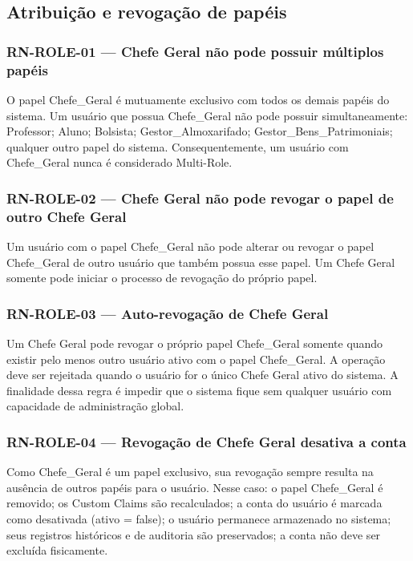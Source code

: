 \subsection{Atribuição e revogação de papéis}
\label{sec:regras-role}
\subsubsection{RN-ROLE-01 — Chefe Geral não pode possuir múltiplos papéis}
O papel Chefe\_Geral é mutuamente exclusivo com todos os demais papéis do sistema.
Um usuário que possua Chefe\_Geral não pode possuir simultaneamente:
Professor;
Aluno;
Bolsista;
Gestor\_Almoxarifado;
Gestor\_Bens\_Patrimoniais;
qualquer outro papel do sistema.
Consequentemente, um usuário com Chefe\_Geral nunca é considerado Multi-Role.

\subsubsection{RN-ROLE-02 — Chefe Geral não pode revogar o papel de outro Chefe Geral}
Um usuário com o papel Chefe\_Geral não pode alterar ou revogar o papel Chefe\_Geral de outro usuário que também possua esse papel.
Um Chefe Geral somente pode iniciar o processo de revogação do próprio papel.

\subsubsection{RN-ROLE-03 — Auto-revogação de Chefe Geral}
Um Chefe Geral pode revogar o próprio papel Chefe\_Geral somente quando existir pelo menos outro usuário ativo com o papel Chefe\_Geral.
A operação deve ser rejeitada quando o usuário for o único Chefe Geral ativo do sistema.
A finalidade dessa regra é impedir que o sistema fique sem qualquer usuário com capacidade de administração global.

\subsubsection{RN-ROLE-04 — Revogação de Chefe Geral desativa a conta}
Como Chefe\_Geral é um papel exclusivo, sua revogação sempre resulta na ausência de outros papéis para o usuário.
Nesse caso:
o papel Chefe\_Geral é removido;
os Custom Claims são recalculados;
a conta do usuário é marcada como desativada (ativo = false);
o usuário permanece armazenado no sistema;
seus registros históricos e de auditoria são preservados;
a conta não deve ser excluída fisicamente.


